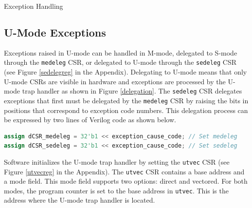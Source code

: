 \documentclass[12pt]{article}
\begin{document}
\begin{section}{Exception Handling}
\subsection{U-Mode Exceptions}
Exceptions raised in U-mode can be handled in M-mode, delegated to S-mode through the {\tt{medeleg}} CSR, or delegated to U-mode through the {\tt{sedeleg}} CSR (see Figure \ref{sedelegreg} in the Appendix). Delegating to U-mode means that only U-mode CSRs are visible in hardware and exceptions are processed by the U-mode trap handler as shown in Figure \ref{delegation}. The {\tt{sedeleg}} CSR delegates exceptions that first must be delegated by the {\tt{medeleg}} CSR by raising the bits in positions that correspond to exception code numbers. This delegation process can be expressed by two lines of Verilog code as shown below.

\begin{lstlisting}[language=Verilog]
assign dCSR_medeleg = 32'b1 << exception_cause_code; // Set medeleg
assign dCSR_sedeleg = 32'b1 << exception_cause_code; // Set sedeleg
\end{lstlisting}

Software initializes the U-mode trap handler by setting the {\tt{utvec}} CSR (see Figure \ref{utvecreg} in the Appendix). The {\tt{utvec}} CSR contains a base address and a mode field. This mode field supports two options: direct and vectored. For both modes, the program counter is set to the base address in {\tt{utvec}}. This is the address where the U-mode trap handler is located.


\end{section}
\end{document}

